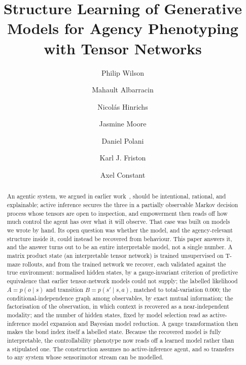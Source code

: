 \documentclass[runningheads]{llncs}
\begin{document}
\title{Structure Learning of Generative Models for Agency Phenotyping
with Tensor Networks}

\author{Philip Wilson \and
Mahault Albarracin \and
Nicol\'{a}s Hinrichs \and
Jasmine Moore \and
Daniel Polani \and
Karl J. Friston \and
Axel Constant}

\maketitle

\begin{abstract}
An agentic system, we argued in earlier work~\cite{wilsonAgency2025}, should be
intentional, rational, and explainable; active inference secures the three in a
partially observable Markov decision process whose tensors are open to inspection, and
empowerment then reads off how much control the agent has over what it will observe.
That case was built on models we wrote by hand. Its open question was whether the model,
and the agency-relevant structure inside it, could instead be recovered from behaviour.
This paper answers it, and the answer turns out to be an entire interpretable model, not
a single number. A matrix product state (an interpretable tensor network) is trained
unsupervised on T-maze rollouts, and from the trained network we recover, each validated
against the true environment: normalised hidden states, by a gauge-invariant criterion
of predictive equivalence that earlier tensor-network models could not supply; the
labelled likelihood $A=p(o\mid s)$ and transition $B=p(s'\mid s,a)$, matched to
total-variation $0.000$; the conditional-independence graph among observables, by exact
mutual information; the factorisation of the observation, in which context is recovered
as a near-independent modality; and the number of hidden states, fixed by model
selection read as active-inference model expansion and Bayesian model reduction. A gauge
transformation then makes the bond index itself a labelled state. Because the recovered
model is fully interpretable, the controllability phenotype now reads off a learned
model rather than a stipulated one. The construction assumes no active-inference agent,
and so transfers to any system whose sensorimotor stream can be modelled.
\end{abstract}
\end{document}
